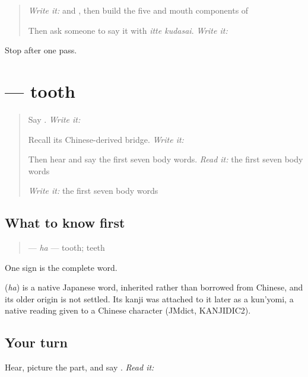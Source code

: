 \label{lesson:JA-R12-foundation-02}



\begin{quote}
\emph{Write it:} \textbf{} and \textbf{}, then build the five and mouth components of \textbf{}

Then ask someone to say it with \emph{itte kudasai}. \emph{Write it:} \textbf{}
\end{quote}

\begin{tcolorbox}[breakable,colback=teal!4,colframe=teal!35!black,title={Before you move on}]
Stop after one pass.
\end{tcolorbox}
\section[\texorpdfstring{\ja{は} (ha)}{は (ha)}]{ — tooth}

\label{lesson:JA-C12-ha-tooth}



\begin{quote}
Say \textbf{}. \emph{Write it:} \textbf{}

Recall its Chinese-derived bridge. \emph{Write it:} \textbf{}

Then hear and say the first seven body words. \emph{Read it:} the first seven body words

\emph{Write it:} the first seven body words
\end{quote}

\subsection*{What to know first}
\begin{quote}
\textbf{} — \emph{ha} — tooth; teeth
\end{quote}

One sign is the complete word.

\begin{cousinweb}
\textbf{} (\emph{ha}) is a native Japanese word, inherited rather than borrowed from Chinese, and its older origin is not settled. Its kanji was attached to it later as a kun'yomi, a native reading given to a Chinese character (JMdict, KANJIDIC2).
\end{cousinweb}

\subsection*{Your turn}
Hear, picture the part, and say \textbf{}. \emph{Read it:} \textbf{}

